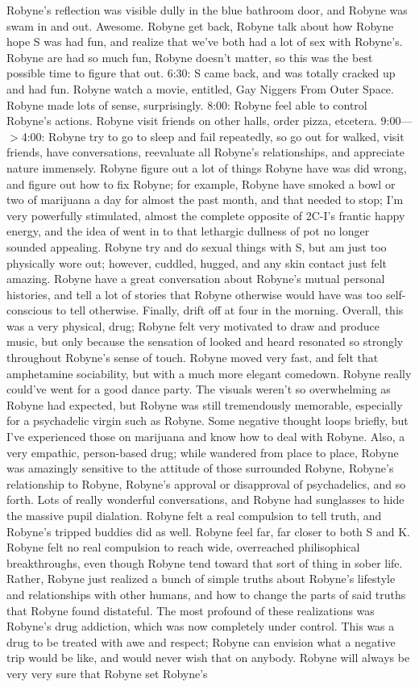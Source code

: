 \documentclass[12pt]{book}
\begin{document}
Robyne's reflection was visible dully in the blue bathroom door, and Robyne was swam in and out. Awesome. Robyne get back, Robyne talk about how Robyne hope S was had fun, and realize that we've both had a lot of sex with Robyne's. Robyne are had so much fun, Robyne doesn't matter, so this was the best possible time to figure that out. 6:30: S came back, and was totally cracked up and had fun. Robyne watch a movie, entitled, Gay Niggers From Outer Space. Robyne made lots of sense, surprisingly. 8:00: Robyne feel able to control Robyne's actions. Robyne visit friends on other halls, order pizza, etcetera. 9:00---$>$4:00: Robyne try to go to sleep and fail repeatedly, so go out for walked, visit friends, have conversations, reevaluate all Robyne's relationships, and appreciate nature immensely. Robyne figure out a lot of things Robyne have was did wrong, and figure out how to fix Robyne; for example, Robyne have smoked a bowl or two of marijuana a day for almost the past month, and that needed to stop; I'm very powerfully stimulated, almost the complete opposite of 2C-I's frantic happy energy, and the idea of went in to that lethargic dullness of pot no longer sounded appealing. Robyne try and do sexual things with S, but am just too physically wore out; however, cuddled, hugged, and any skin contact just felt amazing. Robyne have a great conversation about Robyne's mutual personal histories, and tell a lot of stories that Robyne otherwise would have was too self-conscious to tell otherwise. Finally, drift off at four in the morning. Overall, this was a very physical, drug; Robyne felt very motivated to draw and produce music, but only because the sensation of looked and heard resonated so strongly throughout Robyne's sense of touch. Robyne moved very fast, and felt that amphetamine sociability, but with a much more elegant comedown. Robyne really could've went for a good dance party. The visuals weren't so overwhelming as Robyne had expected, but Robyne was still tremendously memorable, especially for a psychadelic virgin such as Robyne. Some negative thought loops briefly, but I've experienced those on marijuana and know how to deal with Robyne. Also, a very empathic, person-based drug; while wandered from place to place, Robyne was amazingly sensitive to the attitude of those surrounded Robyne, Robyne's relationship to Robyne, Robyne's approval or disapproval of psychadelics, and so forth. Lots of really wonderful conversations, and Robyne had sunglasses to hide the massive pupil dialation. Robyne felt a real compulsion to tell truth, and Robyne's tripped buddies did as well. Robyne feel far, far closer to both S and K. Robyne felt no real compulsion to reach wide, overreached philisophical breakthroughs, even though Robyne tend toward that sort of thing in sober life. Rather, Robyne just realized a bunch of simple truths about Robyne's lifestyle and relationships with other humans, and how to change the parts of said truths that Robyne found distateful. The most profound of these realizations was Robyne's drug addiction, which was now completely under control. This was a drug to be treated with awe and respect; Robyne can envision what a negative trip would be like, and would never wish that on anybody. Robyne will always be very very sure that Robyne set Robyne's 
\end{document}
